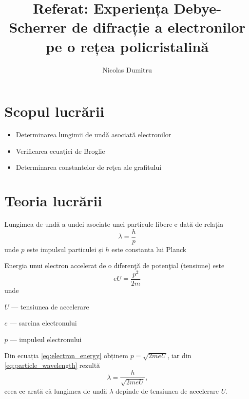 \documentclass[a4paper]{article}
\title{Referat: Experiența Debye-Scherrer de difracție a electronilor pe o rețea
policristalină}
\author{Nicolas Dumitru}
\begin{document}
\maketitle

\section{Scopul lucrării}
\begin{itemize}
	\item Determinarea lungimii de undă asociată electronilor
	\item Verificarea ecuaţiei de Broglie
	\item Determinarea constantelor de reţea ale grafitului
\end{itemize}

\section{Teoria lucrării}
Lungimea de undă a undei asociate unei particule libere e dată de relația
\begin{equation} \label{eq:particle_wavelength}
	\lambda = \frac{h}{p}
\end{equation}
unde $p$ este impulsul particulei și $h$ este constanta lui Planck

Energia unui electron accelerat de o diferenţă de potenţial (tensiune) este
\begin{equation} \label{eq:electron_energy}
	e U = \frac{p^2}{2 m}
\end{equation}
unde \begin{description}
	\item $U$ --- tensiunea de accelerare
	\item $e$ --- sarcina electronului
	\item $p$ --- impulsul electronului
\end{description}

Din ecuația \eqref{eq:electron_energy} obținem $p = \sqrt{2 m e U}$, iar din
\eqref{eq:particle_wavelength} rezultă
\begin{equation} \label{eq:lambda_U}
	\lambda = \frac{h}{\sqrt{2 m e U}} \text{,}
\end{equation}
ceea ce arată că lungimea de undă $\lambda$ depinde de tensiunea de accelerare
$U$.
\end{document}
